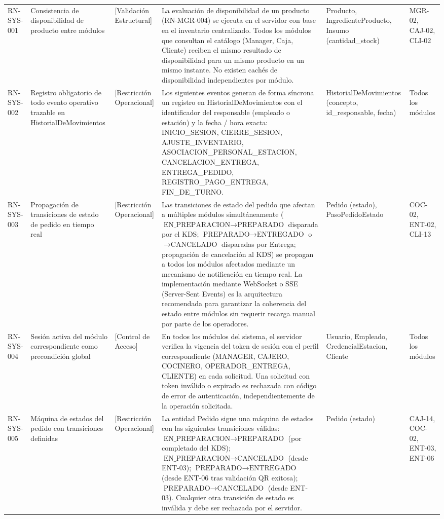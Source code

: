 \begin{landscape}
\begin{longtable}[c]{l p{2.1cm} p{2.1cm} p{8cm} p{4cm} p{3cm}}
RN-SYS-001 & Consistencia de disponibilidad de producto entre módulos & [Validación Estructural] & La evaluación de disponibilidad de un producto (RN-MGR-004) se ejecuta en el servidor con base en el inventario centralizado. Todos los módulos que consultan el catálogo (Manager, Caja, Cliente) reciben el mismo resultado de disponibilidad para un mismo producto en un mismo instante. No existen cachés de disponibilidad independientes por módulo. & Producto, IngredienteProducto, Insumo (cantidad\_stock) & MGR-02, CAJ-02, CLI-02 \\
\addlinespace
RN-SYS-002 & Registro obligatorio de todo evento operativo trazable en HistorialDeMovimientos & [Restricción Operacional] & Los siguientes eventos generan de forma síncrona un registro en HistorialDeMovimientos con el identificador del responsable (empleado o estación) y la fecha / hora exacta: INICIO\_SESION, CIERRE\_SESION, AJUSTE\_INVENTARIO, ASOCIACION\_PERSONAL\_ESTACION, CANCELACION\_ENTREGA, ENTREGA\_PEDIDO, REGISTRO\_PAGO\_ENTREGA, FIN\_DE\_TURNO. & HistorialDeMovimientos (concepto, id\_responsable, fecha) & Todos los módulos \\
\addlinespace
RN-SYS-003 & Propagación de transiciones de estado de pedido en tiempo real & [Restricción Operacional] & Las transiciones de estado del pedido que afectan a múltiples módulos simultáneamente ($\text{EN\_PREPARACION} \rightarrow \text{PREPARADO}$ disparada por el KDS; $\text{PREPARADO} \rightarrow \text{ENTREGADO}$ o $\rightarrow \text{CANCELADO}$ disparadas por Entrega; propagación de cancelación al KDS) se propagan a todos los módulos afectados mediante un mecanismo de notificación en tiempo real. La implementación mediante WebSocket o SSE (Server-Sent Events) es la arquitectura recomendada para garantizar la coherencia del estado entre módulos sin requerir recarga manual por parte de los operadores. & Pedido (estado), PasoPedidoEstado & COC-02, ENT-02, CLI-13 \\
\addlinespace
RN-SYS-004 & Sesión activa del módulo correspondiente como precondición global & [Control de Acceso] & En todos los módulos del sistema, el servidor verifica la vigencia del token de sesión con el perfil correspondiente (MANAGER, CAJERO, COCINERO, OPERADOR\_ENTREGA, CLIENTE) en cada solicitud. Una solicitud con token inválido o expirado es rechazada con código de error de autenticación, independientemente de la operación solicitada. & Usuario, Empleado, CredencialEstacion, Cliente & Todos los módulos \\
\addlinespace
RN-SYS-005 & Máquina de estados del pedido con transiciones definidas & [Restricción Operacional] & La entidad Pedido sigue una máquina de estados con las siguientes transiciones válidas: $\text{EN\_PREPARACION} \rightarrow \text{PREPARADO}$ (por completado del KDS); $\text{EN\_PREPARACION} \rightarrow \text{CANCELADO}$ (desde ENT-03); $\text{PREPARADO} \rightarrow \text{ENTREGADO}$ (desde ENT-06 tras validación QR exitosa); $\text{PREPARADO} \rightarrow \text{CANCELADO}$ (desde ENT-03). Cualquier otra transición de estado es inválida y debe ser rechazada por el servidor. & Pedido (estado) & CAJ-14, COC-02, ENT-03, ENT-06 \\

\end{longtable}
\end{landscape}

